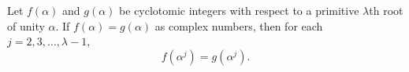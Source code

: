 Let $f(\alpha)$ and $g(\alpha)$ be cyclotomic integers with respect to a primitive $\lambda$th root of unity $\alpha$. If $f(\alpha) = g(\alpha)$ as complex numbers, then for each $j = 2, 3, \ldots, \lambda-1$,
$$f(\alpha^j) = g(\alpha^j).$$
